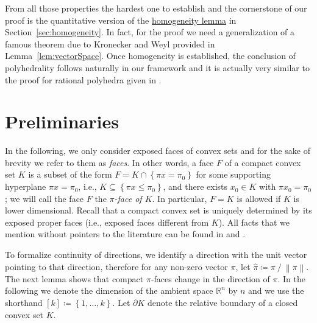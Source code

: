 \documentclass[11pt]{article}
\theoremstyle{remark}
\begin{document}
From all those properties the hardest one to establish and the
cornerstone of our proof is the quantitative version of the
\hyperref[lem:homogeneity]{homogeneity lemma}
in Section~\ref{sec:homogeneity}. 
In fact, for the proof we need a generalization
of a famous theorem due to Kronecker and Weyl provided in
Lemma~\ref{lem:vectorSpace}. Once homogeneity is established, the
conclusion of polyhedrality follows naturally in our
framework and it is actually very similar to the proof for rational
polyhedra given in \cite{schr1980}. 

\section{Preliminaries}
\label{sec:preliminaries}
In the following, we only consider exposed faces of convex sets
and for the sake of
brevity we refer to them as \emph{faces}. 
In other words, a face \(F\) of a compact convex set \(K\)
is a subset of the form \(F = K \cap {\left\{{\pi x = \pi_0}\right\}}\)
for some supporting hyperplane \(\pi x = \pi_0\),
i.e., \(K \subseteq {\left\{{\pi x \leq
\pi_0}\right\}}\), and there exists \(x_0 \in K\) with \(\pi x_0 = \pi_0\);
we will call the face \(F\) the \emph{\(\pi\)-face of \(K\)}.
In particular, \(F = K\) is allowed if \(K\) is lower
dimensional. Recall that a compact convex set is uniquely
determined by its exposed proper faces
(i.e., exposed faces different from \(K\)).
All facts that we mention without pointers to the literature can be
found in \cite{schrijver1998theory} and \cite{barvinok2002course}.

To formalize continuity of directions,
we identify a direction with the unit vector pointing to that
direction,
therefore
for any non-zero vector \(\pi\),
let \({\widehat{{\pi}}} \coloneqq \pi \mathbin{/} {\left\lVert{\pi}\right\rVert}\).
The next lemma shows that compact \(\pi\)-faces
change  in the direction of
\(\pi\). In the following we denote the dimension of the ambient space
\({\mathbb{R}}^n\) by \(n\) and we use the shorthand \([k] \coloneqq {\left\{{1, \dots,k}\right\}}\).
Let \(\partial K\) denote the relative boundary of
a closed convex set \(K\).
\end{document}
